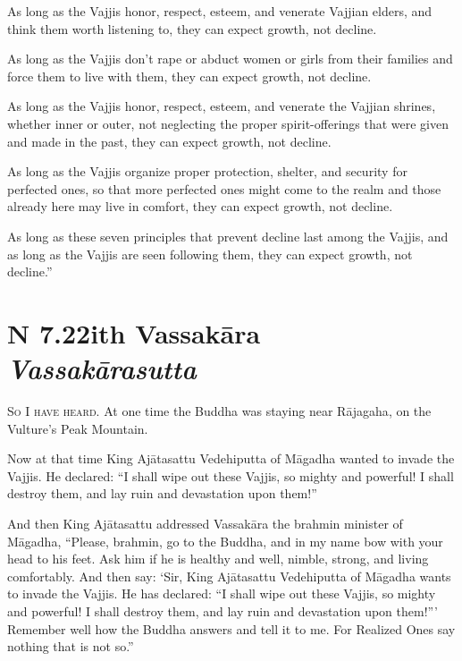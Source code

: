 \documentclass[12pt,openany]{book}%
\newcommand*{\suttatitleacronym}[1]{\smaller[2]{#1}\vspace*{.3em}}
\newcommand*{\suttatitletranslation}[1]{\linebreak{#1}}
\newcommand*{\suttatitleroot}[1]{\linebreak\smaller[2]\itshape{#1}}
\newcommand*{\tocacronym}[1]{\hspace*{-3.3em}{#1}\quad}
\newcommand*{\toctranslation}[1]{#1}
\newcommand*{\tocroot}[1]{(\textit{#1})}
\newcommand*{\scevam}[1]{\textsc{#1}}
\begin{document}
As long as the Vajjis honor, respect, esteem, and venerate Vajjian elders, and think them worth listening to, they can expect growth, not decline. 

As long as the Vajjis don’t rape or abduct women or girls from their families and force them to live with them, they can expect growth, not decline. 

As long as the Vajjis honor, respect, esteem, and venerate the Vajjian shrines, whether inner or outer, not neglecting the proper spirit-offerings that were given and made in the past, they can expect growth, not decline. 

As long as the Vajjis organize proper protection, shelter, and security for perfected ones, so that more perfected ones might come to the realm and those already here may live in comfort, they can expect growth, not decline. 

As long as these seven principles that prevent decline last among the Vajjis, and as long as the Vajjis are seen following them, they can expect growth, not decline.” 

%
\section*{{\suttatitleacronym AN 7.22}{\suttatitletranslation With Vassakāra }{\suttatitleroot Vassakārasutta}}
\addcontentsline{toc}{section}{\tocacronym{AN 7.22} \toctranslation{With Vassakāra } \tocroot{Vassakārasutta}}

\scevam{So I have heard. }At one time the Buddha was staying near \textsanskrit{Rājagaha}, on the Vulture’s Peak Mountain. 

Now at that time King \textsanskrit{Ajātasattu} Vedehiputta of \textsanskrit{Māgadha} wanted to invade the Vajjis. He declared: “I shall wipe out these Vajjis, so mighty and powerful! I shall destroy them, and lay ruin and devastation upon them!” 

And then King \textsanskrit{Ajātasattu} addressed \textsanskrit{Vassakāra} the brahmin minister of \textsanskrit{Māgadha}, “Please, brahmin, go to the Buddha, and in my name bow with your head to his feet. Ask him if he is healthy and well, nimble, strong, and living comfortably. And then say: ‘Sir, King \textsanskrit{Ajātasattu} Vedehiputta of \textsanskrit{Māgadha} wants to invade the Vajjis. He has declared: “I shall wipe out these Vajjis, so mighty and powerful! I shall destroy them, and lay ruin and devastation upon them!”’ Remember well how the Buddha answers and tell it to me. For Realized Ones say nothing that is not so.” 
\end{document}
